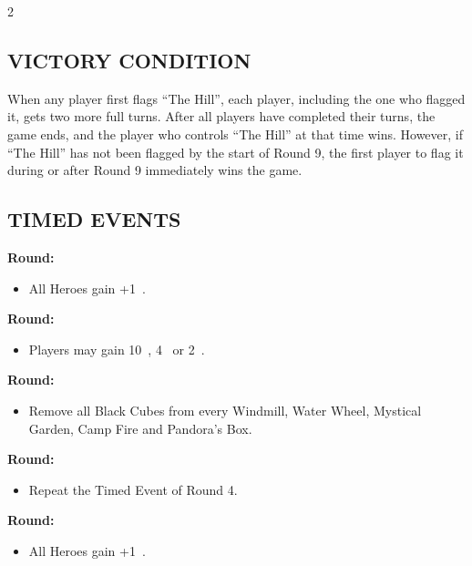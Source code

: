 \begin{multicols*}{2}
\subsection*{\MakeUppercase{Victory Condition}}
When any player first flags ``The Hill'', each player, including the one who flagged it, gets two more full turns. After all players have completed their turns, the game ends, and the player who controls ``The Hill'' at that time wins. However, if ``The Hill'' has not been flagged by the start of Round 9, the first player to flag it during or after Round 9 immediately wins the game.

\subsection*{\MakeUppercase{Timed Events}}
\textbf{ Round:}
\begin{itemize}
  \item All Heroes gain +1~.
\end{itemize}
\textbf{ Round:}
\begin{itemize}
  \item Players may gain 10~, 4~ or 2~.
\end{itemize}
\textbf{ Round:}
\begin{itemize}
  \item Remove all Black Cubes from every Windmill, Water Wheel, Mystical Garden, Camp Fire and Pandora's Box.
\end{itemize}
\textbf{ Round:}
\begin{itemize}
  \item Repeat the Timed Event of Round 4.
\end{itemize}
\textbf{ Round:}
\begin{itemize}
  \item All Heroes gain +1~.
\end{itemize}


\end{multicols*}
